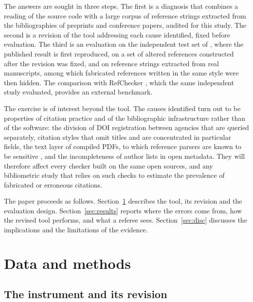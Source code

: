 \documentclass[pdflatex,sn-apa]{sn-jnl}
\begin{document}
The answers are sought in three steps. The first is a diagnosis that combines a reading of the source code with a large corpus of reference strings extracted from the bibliographies of preprints and conference papers, audited for this study. The second is a revision of the tool addressing each cause identified, fixed before evaluation. The third is an evaluation on the independent test set of \citet{badalova2026}, where the published result is first reproduced, on a set of altered references constructed after the revision was fixed, and on reference strings extracted from real manuscripts, among which fabricated references written in the same style were then hidden. The comparison with RefChecker \citep{russinovich2026}, which the same independent study evaluated, provides an external benchmark.

The exercise is of interest beyond the tool. The causes identified turn out to be properties of citation practice and of the bibliographic infrastructure rather than of the software: the division of DOI registration between agencies that are queried separately, citation styles that omit titles and are concentrated in particular fields, the text layer of compiled PDFs, to which reference parsers are known to be sensitive \citep{lopez2009, tkaczyk2015}, and the incompleteness of author lists in open metadata. They will therefore affect every checker built on the same open sources, and any bibliometric study that relies on such checks to estimate the prevalence of fabricated or erroneous citations.

The paper proceeds as follows. Section~\ref{sec:data} describes the tool, its revision and the evaluation design. Section~\ref{sec:results} reports where the errors come from, how the revised tool performs, and what a referee sees. Section~\ref{sec:disc} discusses the implications and the limitations of the evidence.

\section{Data and methods}
\label{sec:data}

\subsection{The instrument and its revision}
\label{sec:tool}
\end{document}
